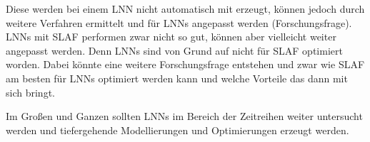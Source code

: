 \documentclass[11pt,ngerman,a4paper,]{article}
\begin{document}
Diese werden bei einem LNN nicht automatisch mit erzeugt, können jedoch durch weitere Verfahren ermittelt und für LNNs angepasst werden (Forschungsfrage). LNNs mit SLAF performen zwar nicht so gut, können aber vielleicht weiter angepasst werden. Denn LNNs sind von Grund auf nicht für SLAF optimiert worden. Dabei könnte eine weitere Forschungsfrage entstehen und zwar wie SLAF am besten für LNNs optimiert werden kann und welche Vorteile das dann mit sich bringt.

Im Großen und Ganzen sollten LNNs im Bereich der Zeitreihen weiter untersucht werden und tiefergehende Modellierungen und Optimierungen erzeugt werden.

\newpage
\printbibliography
\end{document}
